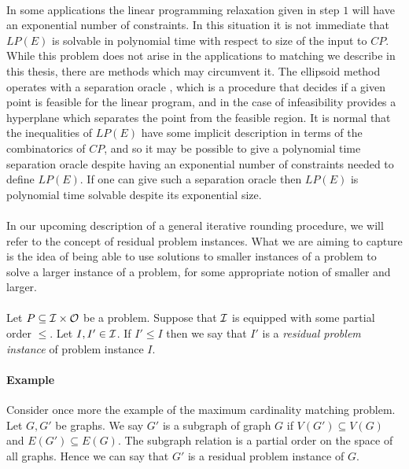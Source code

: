 \paragraph{}
In some applications the linear programming relaxation given in step $1$ will have an exponential number of constraints. In this situation it is not immediate that $LP(E)$ is solvable in polynomial time with respect to size of the input to $CP$. While this problem does not arise in the applications to matching we describe in this thesis, there are methods which may circumvent it. The ellipsoid method operates with a separation oracle \cite{grotschel1981ellipsoid}, which is a procedure that decides if a given point is feasible for the linear program, and in the case of infeasibility provides a hyperplane which separates the point from the feasible region. It is normal that the inequalities of $LP(E)$ have some implicit description in terms of the combinatorics of $CP$, and so it may be possible to give a polynomial time separation oracle despite having an exponential number of constraints needed to define $LP(E)$. If one can give such a separation oracle then $LP(E)$ is polynomial time solvable despite its exponential size.
\paragraph{}
In our upcoming description of a general iterative rounding procedure, we will refer to the concept of residual problem instances. What we are aiming to capture is the idea of being able to use solutions to smaller instances of a problem to solve a larger instance of a problem, for some appropriate notion of smaller and larger.

\paragraph{}Let $P \subseteq \mathcal{I} \times \mathcal{O}$ be a problem. Suppose that $\mathcal{I}$ is equipped with some partial order $\leq$. Let $I, I' \in \mathcal{I}$. If $I' \leq I$ then we say that $I'$ is a {\it residual problem instance} of problem instance $I$.

\paragraph{Example}
Consider once more the example of the maximum cardinality matching problem. Let $G, G'$ be graphs. We say $G'$ is a subgraph of graph $G$ if $V(G') \subseteq V(G)$ and $E(G') \subseteq E(G)$. The subgraph relation is a partial order on the space of all graphs. Hence we can say that $G'$ is a residual problem instance of $G$.

